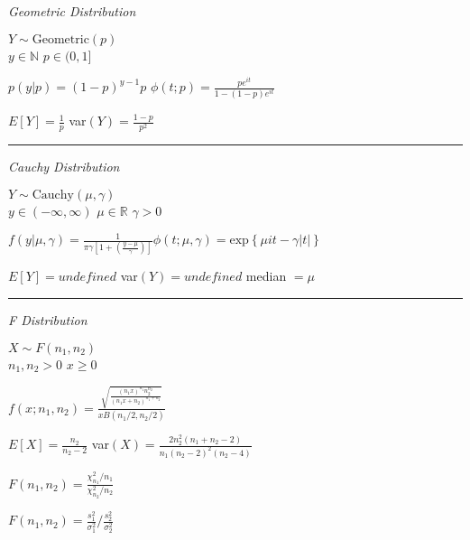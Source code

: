 \documentclass[notitlepage,10pt,twocolumn]{article}
\newcommand\reals{\ensuremath{\mathbb{R}}}
\renewcommand\exp[1]{\text{exp}\left\{ #1 \right\}}
\begin{document}
\emph{\sffamily Geometric Distribution}

$Y \sim \text{Geometric}(p)$\\
	$y \in \mathbb{N}$ \quad $p \in (0,1]$

$p(y|p) = (1-p)^{y-1} p$ \quad $\phi(t;p) = \frac{pe^{it}}{1-(1-p)e^{it}}$

$E[Y] = \frac{1}{p}$ \quad var$(Y) = \frac{1-p}{p^2}$

\vspace{.15cm}\hrule \vspace{.15cm}

\emph{\sffamily Cauchy Distribution}

$Y \sim \text{Cauchy}(\mu,\gamma)$\\
	$y\in(-\infty,\infty)$ \quad $\mu \in \reals$ \quad $\gamma > 0$

$f(y|\mu,\gamma) = \frac{1}{\pi\gamma \left[1+\left(\frac{y-\mu}{\gamma} \right) \right]}$\quad $\phi(t;\mu,\gamma) = \exp{\mu it - \gamma |t|}$

$E[Y] = undefined$ \quad var$(Y) = undefined$ \quad median $= \mu$

\vspace{.15cm}\hrule\vspace{.15cm}

\emph{\sffamily F Distribution}

$X \sim F(n_1,n_2)$\\
$n_1,n_2 > 0$ \quad $x\ge 0$

$f(x;n_1,n_2) = \frac{\sqrt{\frac{(n_1 x)^{n_1}n_2^{n_2}}{(n_1 x + n_2)^{n_1+n_2}}}}{x B(n_1/2,n_2/2)}$

$E[X] = \frac{n_2}{n_2-2}$ \quad var$(X) = \frac{2n_2^2(n_1+n_2-2)}{n_1(n_2-2)^2(n_2-4)}$

$F(n_1,n_2) = \frac{\chi^2_{n_1} / n_1}{\chi^2_{n_2} / n_2}$

$F(n_1,n_2) = \frac{s^2_1}{\sigma^2_1} / \frac{s^2_2}{\sigma^2_2}$
\end{document}
